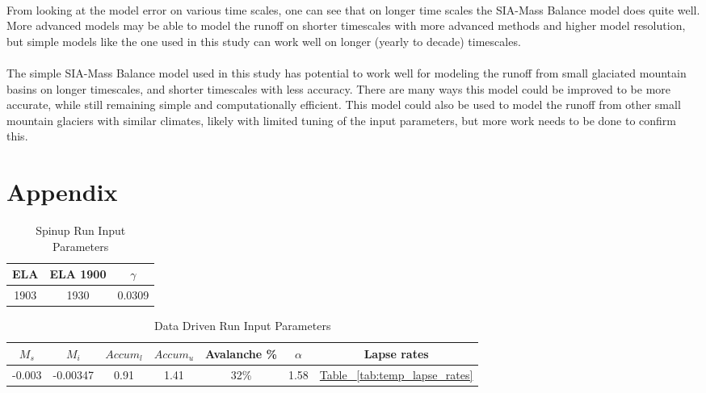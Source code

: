 \documentclass{article}
\begin{document}
\paragraph{}
From looking at the model error on various time scales, one can see that on longer time scales the SIA-Mass Balance model does quite well. More 
advanced models may be able to model the runoff on shorter timescales with more advanced methods and higher model resolution, but simple models 
like the one used in this study can work well on longer (yearly to decade) timescales.
\paragraph{}
The simple SIA-Mass Balance model used in this study has potential to work well for modeling the runoff from small glaciated mountain basins on longer 
timescales, and shorter timescales with less accuracy. There are many ways this model could be improved to be more accurate, while still 
remaining simple and computationally efficient. This model could also be used to model the runoff from other small mountain glaciers with similar climates, 
likely with limited tuning of the input parameters, but more work needs to be done to confirm this. 
\section*{Appendix}
\begin{table}[h!]
    \centering
    \begin{tabular}{|c|c|c|}
        \hline
        ELA &ELA 1900 & $\gamma$ \\
        \hline
        1903 & 1930 &0.0309\\
        \hline
    \end{tabular}
    \caption{Spinup Run Input Parameters}
    \label{tab:spinup_run_input_parameters}
\end{table}
\begin{table}[h!]
    \centering
    \begin{tabular}{|c|c|c|c|c|c|c|}
        \hline
         $M_s$ &$M_i$ & ${Accum}_l$ & ${Accum}_u$ & Avalanche \% & $\alpha$ & Lapse rates\\
        \hline
        -0.003 & -0.00347 & 0.91 & 1.41 & 32\%  &1.58&\hyperref[tab:temp_lapse_rates]{Table ~\ref{tab:temp_lapse_rates}}\\
        \hline
    \end{tabular}
    \caption{Data Driven Run Input Parameters}
    \label{tab:dat_run_input_parameters}
\end{table}
\end{document}
